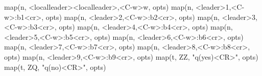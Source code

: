 \documentclass[
  letterpaper,
  DIV=11,
  numbers=noendperiod,
  oneside]{scrartcl}
\newenvironment{Shaded}{\begin{snugshade}}{\end{snugshade}}
\newcommand{\ErrorTok}[1]{\textcolor[rgb]{0.68,0.00,0.00}{#1}}
\newcommand{\ExtensionTok}[1]{\textcolor[rgb]{0.00,0.23,0.31}{#1}}
\newcommand{\KeywordTok}[1]{\textcolor[rgb]{0.00,0.23,0.31}{#1}}
\newcommand{\NormalTok}[1]{\textcolor[rgb]{0.00,0.23,0.31}{#1}}
\newcommand{\OperatorTok}[1]{\textcolor[rgb]{0.37,0.37,0.37}{#1}}
\newcommand{\StringTok}[1]{\textcolor[rgb]{0.13,0.47,0.30}{#1}}
\begin{document}
\begin{Shaded}
\begin{Highlighting}[]
\StringTok{map(\textquotesingle{}n\textquotesingle{}, \textquotesingle{}\textless{}localleader\textgreater{}\textless{}localleader\textgreater{}\textquotesingle{},\textquotesingle{}\textless{}C{-}w\textgreater{}w\textquotesingle{}, opts)}
\StringTok{map(\textquotesingle{}n\textquotesingle{}, \textquotesingle{}\textless{}leader\textgreater{}1\textquotesingle{},\textquotesingle{}\textless{}C{-}w\textgreater{}:b1\textless{}cr\textgreater{}\textquotesingle{}, opts)}
\StringTok{map(\textquotesingle{}n\textquotesingle{}, \textquotesingle{}\textless{}leader\textgreater{}2\textquotesingle{},\textquotesingle{}\textless{}C{-}w\textgreater{}:b2\textless{}cr\textgreater{}\textquotesingle{}, opts)}
\StringTok{map(\textquotesingle{}n\textquotesingle{}, \textquotesingle{}\textless{}leader\textgreater{}3\textquotesingle{},\textquotesingle{}\textless{}C{-}w\textgreater{}:b3\textless{}cr\textgreater{}\textquotesingle{}, opts)}
\StringTok{map(\textquotesingle{}n\textquotesingle{}, \textquotesingle{}\textless{}leader\textgreater{}4\textquotesingle{},\textquotesingle{}\textless{}C{-}w\textgreater{}:b4\textless{}cr\textgreater{}\textquotesingle{}, opts)}
\StringTok{map(\textquotesingle{}n\textquotesingle{}, \textquotesingle{}\textless{}leader\textgreater{}5\textquotesingle{},\textquotesingle{}\textless{}C{-}w\textgreater{}:b5\textless{}cr\textgreater{}\textquotesingle{}, opts)}
\StringTok{map(\textquotesingle{}n\textquotesingle{}, \textquotesingle{}\textless{}leader\textgreater{}6\textquotesingle{},\textquotesingle{}\textless{}C{-}w\textgreater{}:b6\textless{}cr\textgreater{}\textquotesingle{}, opts)}
\StringTok{map(\textquotesingle{}n\textquotesingle{}, \textquotesingle{}\textless{}leader\textgreater{}7\textquotesingle{},\textquotesingle{}\textless{}C{-}w\textgreater{}:b7\textless{}cr\textgreater{}\textquotesingle{}, opts)}
\StringTok{map(\textquotesingle{}n\textquotesingle{}, \textquotesingle{}\textless{}leader\textgreater{}8\textquotesingle{},\textquotesingle{}\textless{}C{-}w\textgreater{}:b8\textless{}cr\textgreater{}\textquotesingle{}, opts)}
\StringTok{map(\textquotesingle{}n\textquotesingle{}, \textquotesingle{}\textless{}leader\textgreater{}9\textquotesingle{},\textquotesingle{}\textless{}C{-}w\textgreater{}:b9\textless{}cr\textgreater{}\textquotesingle{}, opts)}
\StringTok{map(\textquotesingle{}t\textquotesingle{},  \textquotesingle{}ZZ\textquotesingle{}, "}\ExtensionTok{q}\ErrorTok{(}\StringTok{\textquotesingle{}yes\textquotesingle{}}\KeywordTok{)}\OperatorTok{\textless{}}\NormalTok{CR}\OperatorTok{\textgreater{}}\StringTok{", opts)}
\StringTok{map(\textquotesingle{}t\textquotesingle{},  \textquotesingle{}ZQ\textquotesingle{}, "}\NormalTok{q}\KeywordTok{(}\StringTok{\textquotesingle{}no\textquotesingle{}}\KeywordTok{)}\OperatorTok{\textless{}}\NormalTok{CR}\OperatorTok{\textgreater{}}\StringTok{", opts)}

\end{Highlighting}
\end{Shaded}
\end{document}
